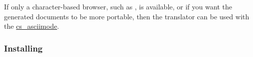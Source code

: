%
%
\html{\\}%

If only a character-based browser, such as , is available,
or if you want the generated documents to be more portable,
then the translator can be used with the 
\hyperref{option}{option (see Section~}{)}{cs_asciimode}.



\subsubsection{Installing \protect\latextohtml}%
\html{\\}%
